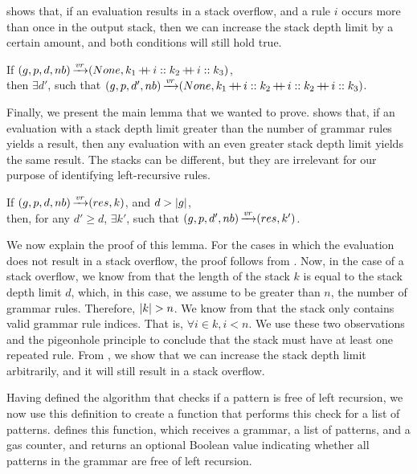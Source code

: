  shows that,
if an evaluation results in a stack overflow,
and a rule $i$ occurs more than once in the output stack,
then we can increase the stack depth limit by a certain amount,
and both conditions will still hold true.

\begin{lemma}%
    If $(g,p,d,nb) \operatorname{\xrightarrow{\mathit{vr}}} (None,k_1 \operatorname{+\kern -0.4em+} i :: k_2 \operatorname{+\kern -0.4em+} i :: k_3)$, \\
    then $\exists d'$,
    such that $(g,p,d',nb) \operatorname{\xrightarrow{\mathit{vr}}} (None,k_1 \operatorname{+\kern -0.4em+} i :: k_2 \operatorname{+\kern -0.4em+} i :: k_2 \operatorname{+\kern -0.4em+} i :: k_3)$.
    \label{lemma:repeated-rule-in-stack}
\end{lemma}

Finally, we present the main lemma
that we wanted to prove.
shows that,
if an evaluation with a stack depth limit
greater than the number of grammar rules
yields a result,
then any evaluation with an even greater stack depth limit
yields the same result.
The stacks can be different,
but they are irrelevant
for our purpose of identifying
left-recursive rules.

\begin{lemma}%
    If $(g,p,d,nb) \operatorname{\xrightarrow{\mathit{vr}}} (res,k)$, and $d > |g|$, \\
    then, for any $d' \ge d$,
    $\exists k'$,
    such that $(g,p,d',nb) \operatorname{\xrightarrow{\mathit{vr}}} (res,k')$.
    \label{lemma:stack-depth-eventual-constancy}
\end{lemma}

We now explain the proof of this lemma.
For the cases in which the evaluation
does not result in a stack overflow,
the proof follows from .
Now, in the case of a stack overflow,
we know from 
that the length of the stack $k$ is equal to the stack depth limit $d$,
which, in this case, we assume to be greater than $n$, the number of grammar rules.
Therefore, $|k| > n$.
We know from 
that the stack only contains valid grammar rule indices.
That is, $\forall i \in k, i < n$.
We use these two observations and the pigeonhole principle to conclude
that the stack must have at least one repeated rule.
From ,
we show that we can increase the stack depth limit arbitrarily,
and it will still result in a stack overflow.

Having defined the algorithm
that checks if a pattern is free of left recursion,
we now use this definition to create a function
that performs this check for a list of patterns.
 defines this function,
which receives a grammar, a list of patterns,
and a gas counter,
and returns an optional Boolean value
indicating whether all patterns in the grammar
are free of left recursion.

